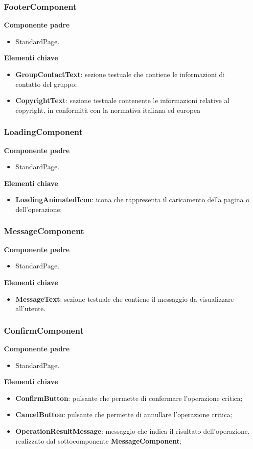 \subsubsection{FooterComponent}
\textbf{Componente padre}
\begin{itemize}
    \item StandardPage.
\end{itemize}
\textbf{Elementi chiave}
\begin{itemize}
    \item \textbf{GroupContactText}: sezione testuale che contiene le informazioni di contatto del gruppo;
    \item \textbf{CopyrightText}: sezione testuale contenente le informazioni relative al copyright, in conformità con la normativa italiana ed europea
\end{itemize}
\subsubsection{LoadingComponent}
\textbf{Componente padre}
\begin{itemize}
    \item StandardPage.
\end{itemize}
\textbf{Elementi chiave}
\begin{itemize}
    \item \textbf{LoadingAnimatedIcon}: icona che rappresenta il caricamento della pagina o dell'operazione;
\end{itemize}
\subsubsection{MessageComponent}
\textbf{Componente padre}
\begin{itemize}
    \item StandardPage.
\end{itemize}
\textbf{Elementi chiave}
\begin{itemize}
    \item \textbf{MessageText}: sezione testuale che contiene il messaggio da visualizzare all'utente.
\end{itemize}
\subsubsection{ConfirmComponent}
\textbf{Componente padre}
\begin{itemize}
    \item StandardPage.
\end{itemize}
\textbf{Elementi chiave}
\begin{itemize}
    \item \textbf{ConfirmButton}: pulsante che permette di confermare l'operazione critica;
    \item \textbf{CancelButton}: pulsante che permette di annullare l'operazione critica;
    \item \textbf{OperationResultMessage}: messaggio che indica il risultato dell'operazione, realizzato dal sottocomponente \textbf{MessageComponent};
\end{itemize}
